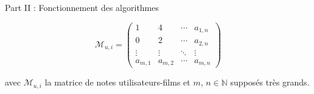 \begin{frame}{Part II : Fonctionnement des algorithmes}

    $$\mathcal{M}_{u, i} =
        \begin{pmatrix}
            1        & 4        & \cdots{} & a_{1, n} \\
            0        & 2        & \cdots{} & a_{2, n} \\
            \vdots{} & \vdots{} & \ddots{} & \vdots{} \\
            a_{m, 1} & a_{m, 2} & \cdots{} & a_{m, n}
        \end{pmatrix}
    $$

    avec $\mathcal{M}_{u, i}$ la matrice de notes utilisateurs-films et $m$, $n \in \mathbb{N}$ supposés très grands.

\end{frame}
